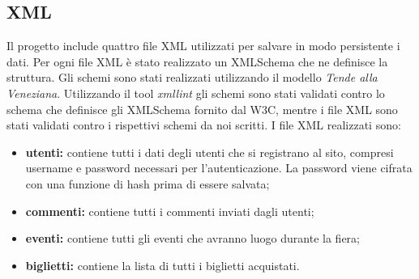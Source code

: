 \subsection{XML}
Il progetto include quattro file XML utilizzati per salvare in modo persistente i dati. Per ogni file XML è stato realizzato un XMLSchema che ne definisce la struttura. Gli schemi sono stati realizzati utilizzando il modello \textit{Tende alla Veneziana}. Utilizzando il tool \textit{xmllint} gli schemi sono stati validati contro lo schema che definisce gli XMLSchema fornito dal W3C, mentre i file XML sono stati validati contro i rispettivi schemi da noi scritti. \newline
I file XML realizzati sono:
\begin{itemize}
	\item \textbf{utenti:} contiene tutti i dati degli utenti che si registrano al sito, compresi username e password necessari per l'autenticazione. La password viene cifrata con una funzione di hash prima di essere salvata;
	\item \textbf{commenti:} contiene tutti i commenti inviati dagli utenti;
	\item \textbf{eventi:} contiene tutti gli eventi che avranno luogo durante la fiera;
	\item \textbf{biglietti:} contiene la lista di tutti i biglietti acquistati.
\end{itemize}